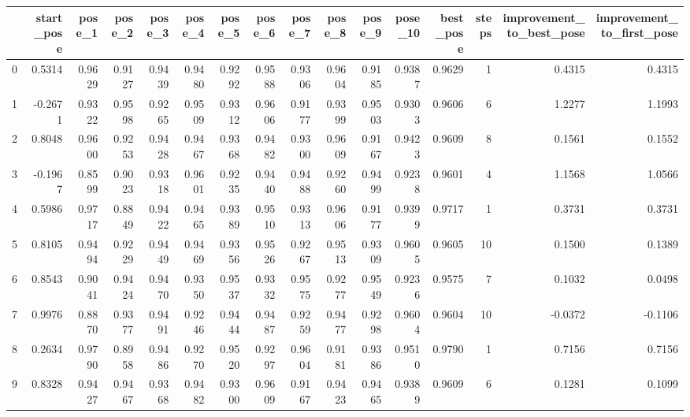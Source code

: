 \begin{tabular}{lrrrrrrrrrrrrrrr}
\toprule
{} &  start\_pose &  pose\_1 &  pose\_2 &  pose\_3 &  pose\_4 &  pose\_5 &  pose\_6 &  pose\_7 &  pose\_8 &  pose\_9 &  pose\_10 &  best\_pose &  steps &  improvement\_to\_best\_pose &  improvement\_to\_first\_pose \\
\midrule
0   &      0.5314 &  0.9629 &  0.9127 &  0.9439 &  0.9480 &  0.9292 &  0.9588 &  0.9306 &  0.9604 &  0.9185 &   0.9387 &     0.9629 &      1 &                    0.4315 &                     0.4315 \\
1   &     -0.2671 &  0.9322 &  0.9598 &  0.9265 &  0.9509 &  0.9312 &  0.9606 &  0.9177 &  0.9399 &  0.9503 &   0.9303 &     0.9606 &      6 &                    1.2277 &                     1.1993 \\
2   &      0.8048 &  0.9600 &  0.9253 &  0.9428 &  0.9467 &  0.9368 &  0.9482 &  0.9300 &  0.9609 &  0.9167 &   0.9423 &     0.9609 &      8 &                    0.1561 &                     0.1552 \\
3   &     -0.1967 &  0.8599 &  0.9023 &  0.9318 &  0.9601 &  0.9235 &  0.9440 &  0.9488 &  0.9260 &  0.9499 &   0.9238 &     0.9601 &      4 &                    1.1568 &                     1.0566 \\
4   &      0.5986 &  0.9717 &  0.8849 &  0.9422 &  0.9465 &  0.9389 &  0.9510 &  0.9313 &  0.9606 &  0.9177 &   0.9399 &     0.9717 &      1 &                    0.3731 &                     0.3731 \\
5   &      0.8105 &  0.9494 &  0.9229 &  0.9449 &  0.9469 &  0.9356 &  0.9526 &  0.9267 &  0.9513 &  0.9309 &   0.9605 &     0.9605 &     10 &                    0.1500 &                     0.1389 \\
6   &      0.8543 &  0.9041 &  0.9424 &  0.9470 &  0.9350 &  0.9537 &  0.9332 &  0.9575 &  0.9277 &  0.9549 &   0.9236 &     0.9575 &      7 &                    0.1032 &                     0.0498 \\
7   &      0.9976 &  0.8870 &  0.9377 &  0.9491 &  0.9246 &  0.9444 &  0.9487 &  0.9259 &  0.9477 &  0.9298 &   0.9604 &     0.9604 &     10 &                   -0.0372 &                    -0.1106 \\
8   &      0.2634 &  0.9790 &  0.8958 &  0.9486 &  0.9270 &  0.9520 &  0.9297 &  0.9604 &  0.9181 &  0.9386 &   0.9510 &     0.9790 &      1 &                    0.7156 &                     0.7156 \\
9   &      0.8328 &  0.9427 &  0.9467 &  0.9368 &  0.9482 &  0.9300 &  0.9609 &  0.9167 &  0.9423 &  0.9465 &   0.9389 &     0.9609 &      6 &                    0.1281 &                     0.1099 \\

\end{tabular}
